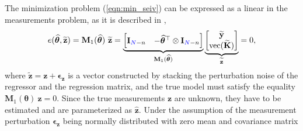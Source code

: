 The minimization problem (\ref{eqn:min_seiv}) can be expressed as a linear in the measurements problem, as it is described in \citet{Pintelon12Book},
\begin{equation} e (\widehat{\bm{\theta}}, \widetilde{\mathbf{z}}) = \mathbf{M}_1( \widehat{\bm{\theta}} ) \ \widetilde{\mathbf{z}} = \underbrace{ \begin{bmatrix} \mathbf{I}_{\color{blue}N\color{black}-n} & - \widehat{\bm{\theta}}^\top \otimes \mathbf{I}_{\color{blue}N\color{black}-n} \end{bmatrix} }_{\mathbf{M}_1( \widehat{\bm{\theta}} )} \underbrace{ \begin{bmatrix} \widetilde{\mathbf{y}} \\ \mathrm{vec} ( \widetilde{\mathbf{K}} ) \end{bmatrix} }_{\widetilde{\mathbf{z}}} = 0 , \label{eqn:M1vecyK} \end{equation}
where $\widetilde{\mathbf{z}} = \mathbf{z} + \bm{\epsilon}_{\mathbf{z}}$ is a vector constructed by stacking the perturbation noise of the regressor and the regression matrix, and the true model must satisfy the equality $\mathbf{M}_1( \bm{\theta} ) \ \mathbf{z} = 0$.
Since the true measurements $\mathbf{z}$ are unknown, they have to be estimated and are parameterized as $\widehat{\mathbf{z}}$.
Under the assumption of the measurement perturbation $\bm{\epsilon}_{\mathbf{z}}$ being normally distributed with zero mean and covariance matrix 
